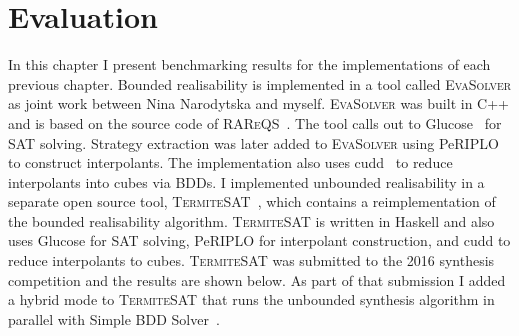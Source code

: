 \chapter{Evaluation}
\label{ch:evaluation}

\newcommand{\eva}[0]{\textsc{EvaSolver}\xspace}
\newcommand{\termitesat}[0]{\textsc{TermiteSAT}\xspace}
\newcommand{\ignore}[1]{}




In this chapter I present benchmarking results for the implementations of each previous chapter. Bounded realisability is implemented in a tool called \eva as joint work between Nina Narodytska and myself. \eva was built in C++ and is based on the source code of \textsc{RAReQS}~\cite{Janota12}. The tool calls out to Glucose~\cite{Audemard09} for SAT solving. Strategy extraction was later added to \eva using PeRIPLO~\cite{Rollini13} to construct interpolants. The implementation also uses cudd~\cite{Somenzi01} to reduce interpolants into cubes via BDDs. I implemented unbounded realisability in a separate open source tool, \termitesat~\cite{TermiteSAT}, which contains a reimplementation of the bounded realisability algorithm. \termitesat is written in Haskell and also uses Glucose for SAT solving, PeRIPLO for interpolant construction, and cudd to reduce interpolants to cubes. \termitesat was submitted to the 2016 synthesis competition and the results are shown below. As part of that submission I added a hybrid mode to \termitesat that runs the unbounded synthesis algorithm in parallel with Simple BDD Solver~\cite{Walker14b}.


